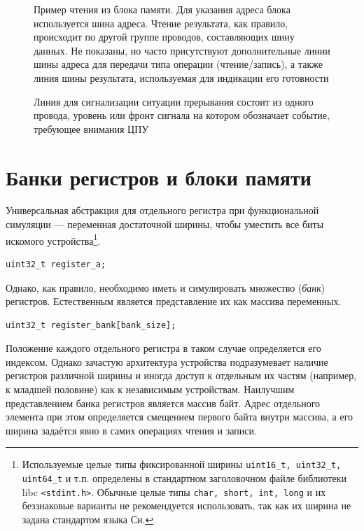 \begin{figure}[htb]
    \centering
    \caption[Пример чтения из блока памяти]{Пример чтения из блока памяти. Для указания адреса блока используется шина адреса. Чтение результата, как правило, происходит по другой группе проводов, составляющих шину данных. Не показаны, но часто присутствуют дополнительные линии шины адреса для передачи типа операции (чтение/запись), а также линия шины результата, используемая для индикации его готовности}
    \label{fig:membus}
\end{figure}

\begin{figure}[htb]
    \centering
    \caption[Линия прерывания]{Линия для сигнализации ситуации прерывания состоит из одного провода, уровень или фронт сигнала на котором обозначает событие, требующее внимания ЦПУ}
    \label{fig:interrupt-line}
\end{figure}


\section{Банки регистров и блоки памяти}

Универсальная абстракция для отдельного регистра при функциональной симуляции --- переменная достаточной ширины, чтобы уместить все биты искомого устройства\footnote{Используемые целые типы фиксированной ширины \texttt{uint16_t, uint32_t, uint64_t} и т.п. определены в стандартном заголовочном файле библиотеки libc \texttt{<stdint.h>}. Обычные целые типы \texttt{char, short, int, long} и их беззнаковые варианты не рекомендуется использовать, так как их ширина не задана стандартом языка Си.}.

\begin{lstlisting}
uint32_t register_a;
\end{lstlisting} 

Однако, как правило, необходимо иметь и симулировать множество (\textit{банк}) регистров. Естественным является представление их как массива переменных. 
\begin{lstlisting}
uint32_t register_bank[bank_size];
\end{lstlisting}

Положение каждого отдельного регистра в таком случае определяется его индексом. Однако зачастую архитектура устройства подразумевает наличие регистров различной ширины и иногда доступ к отдельным их частям (например, к младшей половине)  как к независимым устройствам. Наилучшим представлением банка регистров является массив байт. Адрес отдельного элемента при этом определяется смещением первого байта внутри массива, а его ширина задаётся явно в самих операциях чтения и записи.

